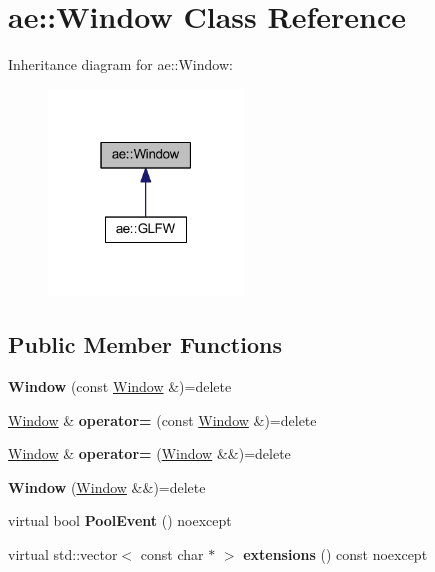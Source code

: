 \hypertarget{classae_1_1_window}{}\section{ae\+:\+:Window Class Reference}
\label{classae_1_1_window}


Inheritance diagram for ae\+:\+:Window\+:
\nopagebreak
\begin{figure}[H]
\begin{center}
\leavevmode
\includegraphics[width=147pt]{classae_1_1_window__inherit__graph}
\end{center}
\end{figure}
\subsection*{Public Member Functions}
\begin{DoxyCompactItemize}
\item 
\hypertarget{classae_1_1_window_aed0533cd4a633df7e42779eb3a6bafa6}{}\label{classae_1_1_window_aed0533cd4a633df7e42779eb3a6bafa6} 
{\bfseries Window} (const \hyperlink{classae_1_1_window}{Window} \&)=delete
\item 
\hypertarget{classae_1_1_window_a4cee2c65aa9028c2f540008c6d73ace0}{}\label{classae_1_1_window_a4cee2c65aa9028c2f540008c6d73ace0} 
\hyperlink{classae_1_1_window}{Window} \& {\bfseries operator=} (const \hyperlink{classae_1_1_window}{Window} \&)=delete
\item 
\hypertarget{classae_1_1_window_a27055c3b7bd792501f9fb94cc8fd898b}{}\label{classae_1_1_window_a27055c3b7bd792501f9fb94cc8fd898b} 
\hyperlink{classae_1_1_window}{Window} \& {\bfseries operator=} (\hyperlink{classae_1_1_window}{Window} \&\&)=delete
\item 
\hypertarget{classae_1_1_window_a4f08ce502de00e126f730e2121691658}{}\label{classae_1_1_window_a4f08ce502de00e126f730e2121691658} 
{\bfseries Window} (\hyperlink{classae_1_1_window}{Window} \&\&)=delete
\item 
\hypertarget{classae_1_1_window_a073b038d68804c5deeec8c9b2a9f2de2}{}\label{classae_1_1_window_a073b038d68804c5deeec8c9b2a9f2de2} 
virtual bool {\bfseries Pool\+Event} () noexcept
\item 
\hypertarget{classae_1_1_window_a64aeae1efc86ce9e502233ad8fae090b}{}\label{classae_1_1_window_a64aeae1efc86ce9e502233ad8fae090b} 
virtual std\+::vector$<$ const char $\ast$ $>$ {\bfseries extensions} () const noexcept
\end{DoxyCompactItemize}
